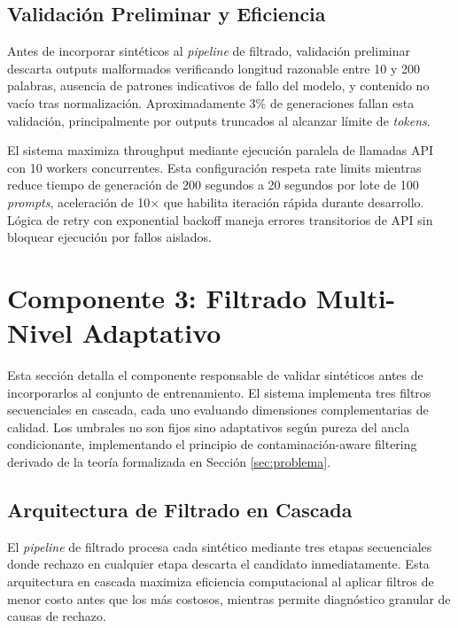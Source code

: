 \subsection{Validación Preliminar y Eficiencia}
\label{subsec:validacion_eficiencia}

Antes de incorporar sintéticos al \textit{pipeline} de filtrado, validación preliminar descarta outputs malformados verificando longitud razonable entre 10 y 200 palabras, ausencia de patrones indicativos de fallo del modelo, y contenido no vacío tras normalización. Aproximadamente 3\% de generaciones fallan esta validación, principalmente por outputs truncados al alcanzar límite de \textit{tokens}.

El sistema maximiza throughput mediante ejecución paralela de llamadas API con 10 workers concurrentes. Esta configuración respeta rate limits mientras reduce tiempo de generación de 200 segundos a 20 segundos por lote de 100 \textit{prompts}, aceleración de 10$\times$ que habilita iteración rápida durante desarrollo. Lógica de retry con exponential backoff maneja errores transitorios de API sin bloquear ejecución por fallos aislados.

\section{Componente 3: Filtrado Multi-Nivel Adaptativo}
\label{sec:filtrado}

Esta sección detalla el componente responsable de validar sintéticos antes de incorporarlos al conjunto de entrenamiento. El sistema implementa tres filtros secuenciales en cascada, cada uno evaluando dimensiones complementarias de calidad. Los umbrales no son fijos sino adaptativos según pureza del ancla condicionante, implementando el principio de contaminación-aware filtering derivado de la teoría formalizada en Sección \ref{sec:problema}.

\subsection{Arquitectura de Filtrado en Cascada}
\label{subsec:cascada}

El \textit{pipeline} de filtrado procesa cada sintético mediante tres etapas secuenciales donde rechazo en cualquier etapa descarta el candidato inmediatamente. Esta arquitectura en cascada maximiza eficiencia computacional al aplicar filtros de menor costo antes que los más costosos, mientras permite diagnóstico granular de causas de rechazo.

